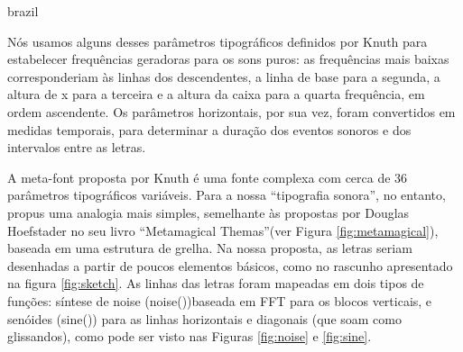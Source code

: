 \begin{otherlanguage*}{brazil}

Nós usamos alguns desses parâmetros tipográficos definidos por Knuth para estabelecer frequências geradoras para os sons puros: as frequências mais baixas corresponderiam às linhas dos descendentes, a linha de base para a segunda, a altura de x para a terceira e a altura da caixa para a quarta frequência, em ordem ascendente. Os parâmetros horizontais, por sua vez, foram convertidos em medidas temporais, para determinar a duração dos eventos sonoros e dos intervalos entre as letras.


A meta-font proposta por Knuth é uma fonte complexa com cerca de 36 parâmetros tipográficos variáveis. Para a nossa ``tipografia sonora'', no entanto, propus uma analogia mais simples, semelhante às propostas por Douglas Hoefstader no seu livro ``Metamagical Themas''\cite{Metamagical1986}(ver Figura \ref{fig:metamagical}), baseada em uma estrutura de grelha. Na nossa proposta, as letras seriam desenhadas a partir de poucos elementos básicos, como no rascunho apresentado na figura \ref{fig:sketch}. As linhas das letras foram mapeadas em dois tipos de funções: síntese de noise (noise())baseada em FFT para os blocos verticais, e senóides (sine()) para as linhas horizontais e diagonais (que soam como glissandos), como pode ser visto nas Figuras \ref{fig:noise} e \ref{fig:sine}. 





\end{otherlanguage*}

